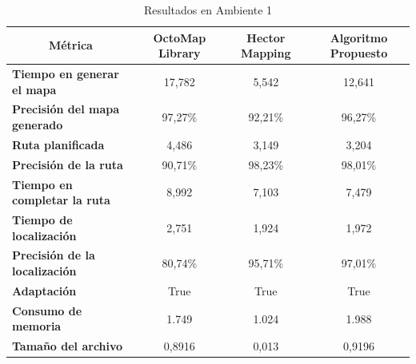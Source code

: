 \begin{table}[H]
\centering
\begin{tabular}{@{}lccc@{}}
\toprule
\multicolumn{1}{|c|}{\textbf{Métrica}} &
  \multicolumn{1}{c|}{\textbf{OctoMap Library}} &
  \multicolumn{1}{c|}{\textbf{Hector Mapping}} &
  \multicolumn{1}{c|}{\textbf{Algoritmo Propuesto}} \\ \midrule
\multicolumn{1}{|l|}{\textbf{Tiempo en generar el mapa}}    & \multicolumn{1}{c|}{17,782} & \multicolumn{1}{c|}{5,542} & \multicolumn{1}{c|}{12,641} \\ \midrule
\multicolumn{1}{|l|}{\textbf{Precisión del mapa generado}}  & \multicolumn{1}{c|}{97,27\%} & \multicolumn{1}{c|}{92,21\%} & \multicolumn{1}{c|}{96,27\%} \\ \midrule
\multicolumn{1}{|l|}{\textbf{Ruta planificada}}             & \multicolumn{1}{c|}{4,486} & \multicolumn{1}{c|}{3,149} & \multicolumn{1}{c|}{3,204} \\ \midrule
\multicolumn{1}{|l|}{\textbf{Precisión de la ruta}}         & \multicolumn{1}{c|}{90,71\%} & \multicolumn{1}{c|}{98,23\%} & \multicolumn{1}{c|}{98,01\%} \\ \midrule
\multicolumn{1}{|l|}{\textbf{Tiempo en completar la ruta}}  & \multicolumn{1}{c|}{8,992} & \multicolumn{1}{c|}{7,103} & \multicolumn{1}{c|}{7,479} \\ \midrule
\multicolumn{1}{|l|}{\textbf{Tiempo de localización}}       & \multicolumn{1}{c|}{2,751} & \multicolumn{1}{c|}{1,924} & \multicolumn{1}{c|}{1,972} \\ \midrule
\multicolumn{1}{|l|}{\textbf{Precisión de la localización}} & \multicolumn{1}{c|}{80,74\%} & \multicolumn{1}{c|}{95,71\%} & \multicolumn{1}{c|}{97,01\%} \\ \midrule
\multicolumn{1}{|l|}{\textbf{Adaptación}}                   & \multicolumn{1}{c|}{True} & \multicolumn{1}{c|}{True} & \multicolumn{1}{c|}{True} \\ \midrule
\multicolumn{1}{|l|}{\textbf{Consumo de memoria}}           & \multicolumn{1}{c|}{1.749} & \multicolumn{1}{c|}{1.024} & \multicolumn{1}{c|}{1.988} \\ \midrule
\multicolumn{1}{|l|}{\textbf{Tamaño del archivo}}           & \multicolumn{1}{c|}{0,8916} & \multicolumn{1}{c|}{0,013} & \multicolumn{1}{c|}{0,9196} \\ \bottomrule
\end{tabular}
\caption{Resultados en Ambiente 1}
\label{tab:resultados_ambiente_1}
\end{table}

